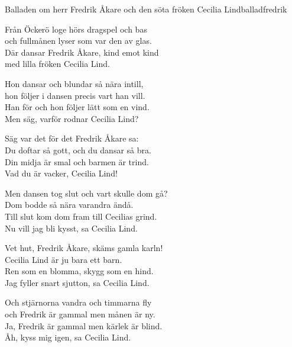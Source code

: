 \newpage
\begin{song}{Balladen om herr Fredrik Åkare och den söta fröken Cecilia Lind}{balladfredrik}
\begin{vers}
Från Öckerö loge hörs dragspel och bas\\
och fullmånen lyser som var den av glas.\\
Där dansar Fredrik Åkare, kind emot kind\\
med lilla fröken Cecilia Lind.\\
\end{vers}
\begin{vers}
Hon dansar och blundar så nära intill,\\
hon följer i dansen precis vart han vill.\\
Han för och hon följer lätt som en vind.\\
Men säg, varför rodnar Cecilia Lind?\\
\end{vers}
\begin{vers}
Säg var det för det Fredrik Åkare sa:\\
Du doftar så gott, och du dansar så bra.\\
Din midja är smal och barmen är trind.\\
Vad du är vacker, Cecilia Lind!\\
\end{vers}
\begin{vers}
Men dansen tog slut och vart skulle dom gå?\\
Dom bodde så nära varandra ändå.\\
Till slut kom dom fram till Cecilias grind.\\
Nu vill jag bli kysst, sa Cecilia Lind.\\
\end{vers}

\newp

\begin{vers}
Vet hut, Fredrik Åkare, skäms gamla karln!\\
Cecilia Lind är ju bara ett barn.\\
Ren som en blomma, skygg som en hind.\\
Jag fyller snart sjutton, sa Cecilia Lind.\\
\end{vers}

\begin{vers}
Och stjärnorna vandra och timmarna fly\\
och Fredrik är gammal men månen är ny.\\
Ja, Fredrik är gammal men kärlek är blind.\\
Åh, kyss mig igen, sa Cecilia Lind. \\
\end{vers}
\end{song}

